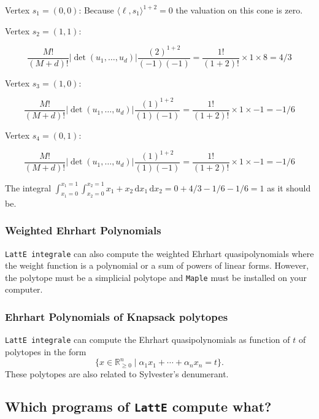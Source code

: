 \documentclass{article}
\newcommand{\R}{{\mathbb R}}
\newcommand{\latteInt}{{\tt LattE integrale}\xspace}
\newcommand{\maple}{{\tt Maple}\xspace}
\renewcommand\d{\,\mathrm{d}}
\begin{document}
Vertex $s_1 = (0,0)$: Because $\langle \ell, s_1 \rangle ^{1+2} = 0$ the valuation on this cone is zero.

Vertex $s_2 = (1,1)$: 

\begin{displaymath}
 \frac{M!}{(M+d)!} |\det(u_1, \dots, u_d)| \frac{(2)^{1+2}}{(-1)(-1)} = \frac{1!}{(1+2)!} \times 1 \times 8 = 4/3
\end{displaymath}

Vertex $s_3 = (1,0)$: 
        
\begin{displaymath}
 \frac{M!}{(M+d)!} |\det(u_1, \dots, u_d)| \frac{(1)^{1+2}}{(1)(-1)} = \frac{1!}{(1+2)!} \times 1 \times -1 = -1/6
\end{displaymath}


Vertex $s_4 = (0,1):$ 


\begin{displaymath}
 \frac{M!}{(M+d)!} |\det(u_1, \dots, u_d)| \frac{(1)^{1+2}}{(1)(-1)} = \frac{1!}{(1+2)!} \times 1 \times -1 = -1/6
\end{displaymath}

The integral $\int_{x_1 = 0}^{x_1 = 1}\int_{x_2 = 0}^{x_2 = 1} x_1 +x_2  \d{x_1}\d{x_2} = 0 + 4/3 -1/6 - 1/6 = 1$ as it should be.

\subsubsection{Weighted Ehrhart Polynomials}

\latteInt can also compute the weighted Ehrhart quasipolynomials where the weight function is a polynomial or a sum of powers of linear forms. However, the polytope must be a simplicial polytope and \maple must be installed on your computer.


\subsubsection{Ehrhart Polynomials of Knapsack polytopes}

\latteInt can compute the Ehrhart quasipolynomials as function of $t$ of polytopes in the form \[ \{x\in \R^n_{\geq 0} \mid \alpha_1 x_1 + \cdots + \alpha_n x_n = t\}.\]
These polytopes are also related to Sylvester's denumerant.


\subsection{Which programs of {\tt LattE} compute what?}
\end{document}
